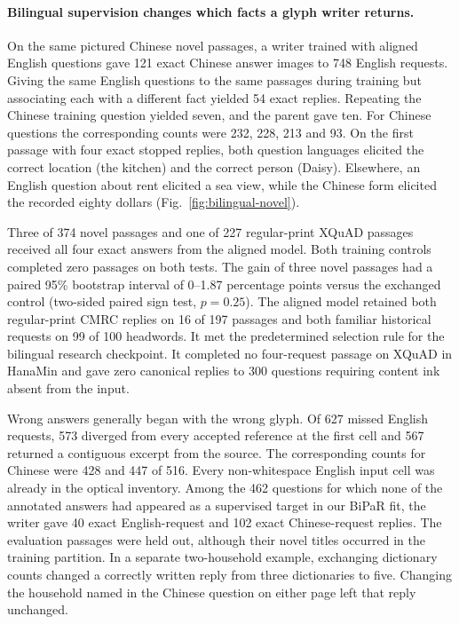 \paragraph{Bilingual supervision changes which facts a glyph writer returns.}
On the same pictured Chinese novel passages, a writer trained with aligned English questions gave 121 exact Chinese answer images to 748 English requests. Giving the same English questions to the same passages during training but associating each with a different fact yielded 54 exact replies. Repeating the Chinese training question yielded seven, and the parent gave ten. For Chinese questions the corresponding counts were 232, 228, 213 and 93. On the first passage with four exact stopped replies, both question languages elicited the correct location (the kitchen) and the correct person (Daisy). Elsewhere, an English question about rent elicited a sea view, while the Chinese form elicited the recorded eighty dollars (Fig.~\ref{fig:bilingual-novel}).

Three of 374 novel passages and one of 227 regular-print XQuAD passages received all four exact answers from the aligned model. Both training controls completed zero passages on both tests. The gain of three novel passages had a paired 95\% bootstrap interval of 0--1.87 percentage points versus the exchanged control (two-sided paired sign test, $p=0.25$). The aligned model retained both regular-print CMRC replies on 16 of 197 passages and both familiar historical requests on 99 of 100 headwords. It met the predetermined selection rule for the bilingual research checkpoint. It completed no four-request passage on XQuAD in HanaMin and gave zero canonical replies to 300 questions requiring content ink absent from the input.

Wrong answers generally began with the wrong glyph. Of 627 missed English requests, 573 diverged from every accepted reference at the first cell and 567 returned a contiguous excerpt from the source. The corresponding counts for Chinese were 428 and 447 of 516. Every non-whitespace English input cell was already in the optical inventory. Among the 462 questions for which none of the annotated answers had appeared as a supervised target in our BiPaR fit, the writer gave 40 exact English-request and 102 exact Chinese-request replies. The evaluation passages were held out, although their novel titles occurred in the training partition. In a separate two-household example, exchanging dictionary counts changed a correctly written reply from three dictionaries to five. Changing the household named in the Chinese question on either page left that reply unchanged.

